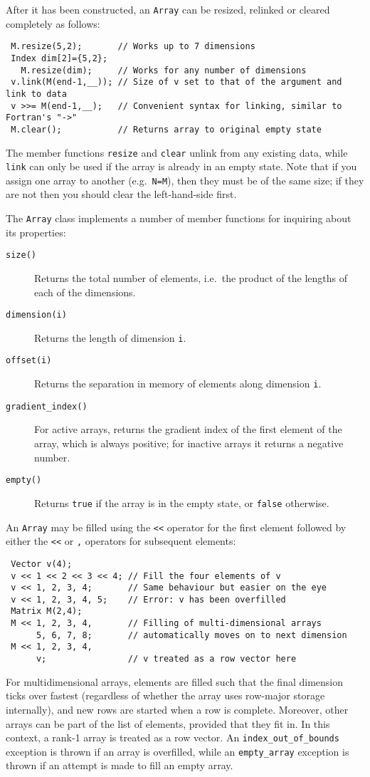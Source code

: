 \documentclass[a4,oneside]{book}
\def\codesize{\small}
\def\code#1{{\codesize\texttt{#1}}}
\def\citem#1{\item[{\codesize\texttt{#1}}]}
\begin{document}
After it has been constructed, an \code{Array} can be resized,
relinked or cleared completely as follows:
\begin{lstlisting}
 M.resize(5,2);       // Works up to 7 dimensions
 Index dim[2]={5,2};
   M.resize(dim);     // Works for any number of dimensions
 v.link(M(end-1,__)); // Size of v set to that of the argument and link to data
 v >>= M(end-1,__);   // Convenient syntax for linking, similar to Fortran's "->"
 M.clear();           // Returns array to original empty state
\end{lstlisting}
The member functions \code{resize} and \code{clear} unlink from any
existing data, while \code{link} can only be used if the array is
already in an empty state.  Note that if you assign one array to
another (e.g.\ \code{N=M}), then they must be of the same size; if
they are not then you should clear the left-hand-side first.

The \code{Array} class implements a number of member functions for
inquiring about its properties:
\begin{description}
\citem{size()} Returns the total number of elements, i.e.\ the product
of the lengths of each of the dimensions.
\citem{dimension(i)} Returns the length of dimension \code{i}.
\citem{offset(i)} Returns the separation in memory of elements along
dimension \code{i}.
\citem{gradient\_index()} For active arrays, returns the gradient
index of the first element of the array, which is always positive; for
inactive arrays it returns a negative number.
\citem{empty()} Returns \code{true} if the array is in the empty
state, or \code{false} otherwise.
\end{description}

An \code{Array} may be filled using the \code{<<} operator for the
first element followed by either the \code{<<} or \code{,} operators
for subsequent elements:
\begin{lstlisting}
 Vector v(4);
 v << 1 << 2 << 3 << 4; // Fill the four elements of v
 v << 1, 2, 3, 4;       // Same behaviour but easier on the eye
 v << 1, 2, 3, 4, 5;    // Error: v has been overfilled
 Matrix M(2,4);
 M << 1, 2, 3, 4,       // Filling of multi-dimensional arrays
      5, 6, 7, 8;       // automatically moves on to next dimension
 M << 1, 2, 3, 4,
      v;                // v treated as a row vector here
\end{lstlisting}
For multidimensional arrays, elements are filled such that the final
dimension ticks over fastest (regardless of whether the array uses
row-major storage internally), and new rows are started when a row is
complete. Moreover, other arrays can be part of the list of elements,
provided that they fit in.  In this context, a rank-1 array is treated
as a row vector. An \code{index\_out\_of\_bounds} exception is thrown
if an array is overfilled, while an \code{empty\_array} exception is
thrown if an attempt is made to fill an empty array.
\end{document}

